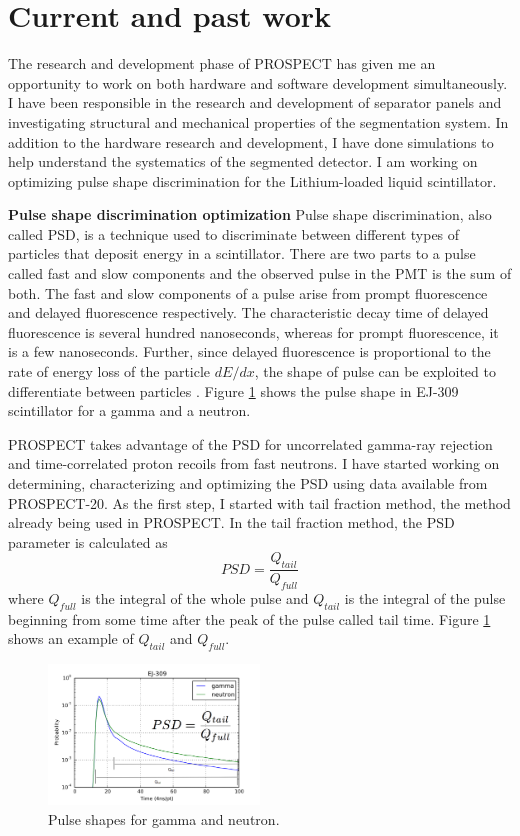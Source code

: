 \documentclass[11pt]{article}
\numberwithin{equation}{section}
\begin{document}
\section[Current and past work]{Current and past work} 
\label{sec:currentwork}
The research and development phase of PROSPECT has given me an opportunity to work on both hardware and software development simultaneously. I have been responsible in the research and development of separator panels and investigating structural and mechanical properties of the segmentation system. In addition to the hardware research and development, I have done simulations to help understand the systematics of the segmented detector. I am working on optimizing pulse shape discrimination for the Lithium-loaded liquid scintillator.

\noindent
\textbf{Pulse shape discrimination optimization}
\noindent
Pulse shape discrimination, also called PSD, is a technique used to discriminate between different types of particles that deposit energy in a scintillator. There are two parts to a pulse called fast and slow components and the observed pulse in the PMT is the sum of both. The fast and slow components of a pulse arise from prompt fluorescence and delayed fluorescence respectively. The characteristic decay time of delayed fluorescence is several hundred nanoseconds, whereas for prompt fluorescence, it is a few nanoseconds. Further, since delayed fluorescence is proportional to the rate of energy loss of the particle $dE/dx$, the shape of pulse can be exploited to differentiate between particles \cite{knoll2010radiation}. Figure \ref{fig:waveform} shows the pulse shape in EJ-309 scintillator for a gamma and a neutron. 

PROSPECT takes advantage of the PSD for uncorrelated gamma-ray rejection and time-correlated proton recoils from fast neutrons. I have started working on determining, characterizing and optimizing the PSD using data available from PROSPECT-20. As the first step, I started with tail fraction method, the method already being used in PROSPECT. In the tail fraction method, the PSD parameter is calculated as 
\begin{equation}
PSD=\frac{Q_{tail}}{Q_{full}}
\end{equation}
where $Q_{full}$ is the integral of the whole pulse and $Q_{tail}$ is the integral of the pulse beginning from some time after the peak of the pulse called tail time. Figure \ref{fig:waveform} shows an example of ${Q_{tail}}$ and ${Q_{full}}$.

\begin{figure}[h]
\centering
\includegraphics*[width=0.5\textwidth]{./waveform.PNG}
\caption{Pulse shapes for gamma and neutron.}
\label{fig:waveform}
\end{figure}
\end{document}
